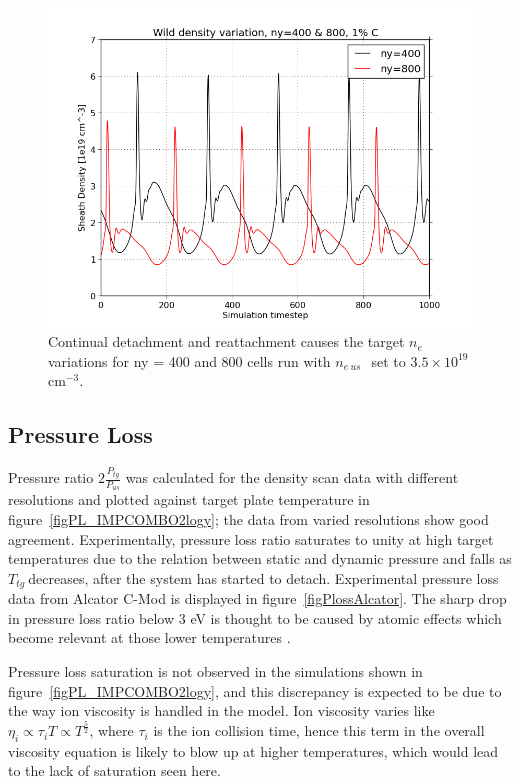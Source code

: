 \documentclass[12pt]{article}  %
\providecommand{\noNe}[1]{{${#1}\times 10^{19}$ cm$^{-3}$}} %
\providecommand{\neus}{$n_{e~us}~$} %
\providecommand{\Ttg}{$T_{tg}~$} %
\begin{document}
\begin{figure}
\includegraphics[scale=0.5]{Figures/sol1d/ny400800r35netg.png}
\centering
\caption{Continual detachment and reattachment causes the target $n_e$ variations for ny = 400 and 800 cells run with \neus~set to \noNe{3.5}.}\label{figny400800r35netg}
\end{figure}

\subsection{Pressure Loss}\label{ssecPloss}
Pressure ratio $2\frac{P_{tg}}{P_{us}}$ was calculated for the density scan data with different resolutions and plotted against target plate temperature in figure~\ref{figPL_IMPCOMBO2logy}; the data from varied resolutions show good agreement. Experimentally, pressure loss ratio saturates to unity at high target temperatures due to the relation between static and dynamic pressure and falls as \Ttg decreases, after the system has started to detach. Experimental pressure loss data from Alcator C-Mod is displayed in figure~\ref{figPlossAlcator}. The sharp drop in pressure loss ratio below 3 eV is thought to be caused by atomic effects which become relevant at those lower temperatures \cite{Pitcher1997}.

Pressure loss saturation is not observed in the simulations shown in figure~\ref{figPL_IMPCOMBO2logy}, and this discrepancy is expected to be due to the way ion viscosity is handled in the model. Ion viscosity varies like $\eta_i \propto \tau_i T \propto T^{\frac{5}{2}}$, where $\tau_i$ is the ion collision time, hence this term in the overall viscosity equation is likely to blow up at higher temperatures, which would lead to the lack of saturation seen here. 
\end{document}
